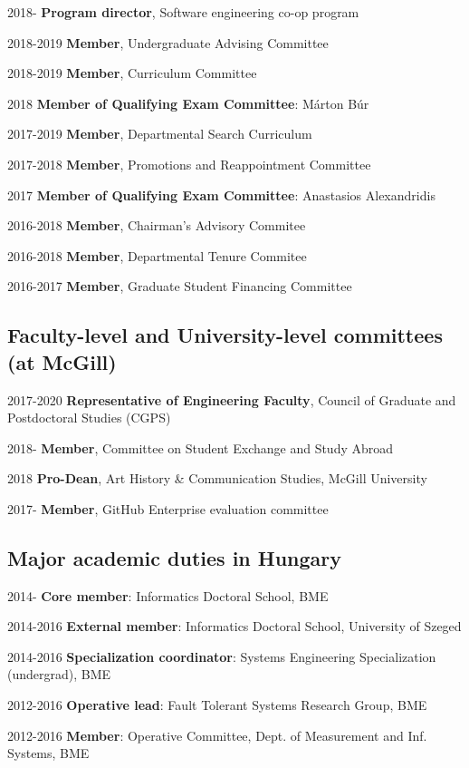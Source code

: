 \begin{yearlist}
\item[2018-] \textbf{Program director}, Software engineering co-op program 
\item[2018-2019] \textbf{Member}, Undergraduate Advising Committee
\item[2018-2019] \textbf{Member}, Curriculum Committee 
\item[2018] \textbf{Member of Qualifying Exam Committee}: M\'arton B\'ur
\item[2017-2019] \textbf{Member}, Departmental Search Curriculum 
\item[2017-2018] \textbf{Member}, Promotions and Reappointment Committee 
\item[2017] \textbf{Member of Qualifying Exam Committee}: Anastasios Alexandridis
\item[2016-2018] \textbf{Member}, Chairman's Advisory Commitee 
\item[2016-2018] \textbf{Member}, Departmental Tenure Commitee 
\item[2016-2017] \textbf{Member}, Graduate Student Financing Committee
\end{yearlist}

\subsection{Faculty-level and University-level committees (at McGill)}
\begin{yearlist}
\item[2017-2020] \textbf{Representative of Engineering Faculty}, Council of Graduate and Postdoctoral Studies (CGPS) 
\item[2018-] \textbf{Member}, Committee on Student Exchange and Study Abroad 
\item[2018] \textbf{Pro-Dean}, Art History \& Communication Studies, McGill University 
\item[2017-] \textbf{Member}, GitHub Enterprise evaluation committee 
\end{yearlist}

\subsection{Major academic duties in Hungary}

\begin{yearlist}
\item[2014-] \textbf{Core member}: Informatics Doctoral School, BME   
\item[2014-2016] \textbf{External member}: Informatics Doctoral School, University of Szeged  
\item[2014-2016] \textbf{Specialization coordinator}:  Systems Engineering Specialization (undergrad), BME   
\item[2012-2016] \textbf{Operative lead}: Fault Tolerant Systems Research Group, BME   
\item[2012-2016] \textbf{Member}: Operative Committee, Dept. of Measurement and Inf. Systems, BME  
\end{yearlist}

